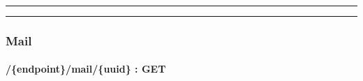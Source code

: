 \documentclass[
]{article}
\begin{document}
\begin{center}\rule{0.5\linewidth}{0.5pt}\end{center}

\begin{center}\rule{0.5\linewidth}{0.5pt}\end{center}

\hypertarget{header-n61644}{%
\subsubsection{Mail}\label{header-n61644}}

\hypertarget{header-n61645}{%
\paragraph{/\{endpoint\}/mail/\{uuid\} : GET}\label{header-n61645}}
\end{document}
